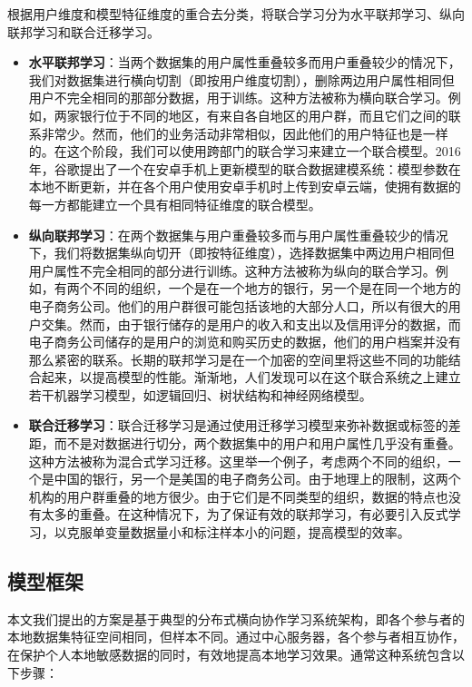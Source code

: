根据用户维度和模型特征维度的重合去分类，将联合学习分为水平联邦学习、纵向联邦学习和联合迁移学习。
\begin{itemize}
\item \textbf{水平联邦学习}：当两个数据集的用户属性重叠较多而用户重叠较少的情况下，我们对数据集进行横向切割（即按用户维度切割），删除两边用户属性相同但用户不完全相同的那部分数据，用于训练。这种方法被称为横向联合学习。例如，两家银行位于不同的地区，有来自各自地区的用户群，而且它们之间的联系非常少。然而，他们的业务活动非常相似，因此他们的用户特征也是一样的。在这个阶段，我们可以使用跨部门的联合学习来建立一个联合模型。2016年，谷歌提出了一个在安卓手机上更新模型的联合数据建模系统：模型参数在本地不断更新，并在各个用户使用安卓手机时上传到安卓云端，使拥有数据的每一方都能建立一个具有相同特征维度的联合模型。

\item \textbf{纵向联邦学习}：在两个数据集与用户重叠较多而与用户属性重叠较少的情况下，我们将数据集纵向切开（即按特征维度），选择数据集中两边用户相同但用户属性不完全相同的部分进行训练。这种方法被称为纵向的联合学习。例如，有两个不同的组织，一个是在一个地方的银行，另一个是在同一个地方的电子商务公司。他们的用户群很可能包括该地的大部分人口，所以有很大的用户交集。然而，由于银行储存的是用户的收入和支出以及信用评分的数据，而电子商务公司储存的是用户的浏览和购买历史的数据，他们的用户档案并没有那么紧密的联系。长期的联邦学习是在一个加密的空间里将这些不同的功能结合起来，以提高模型的性能。渐渐地，人们发现可以在这个联合系统之上建立若干机器学习模型，如逻辑回归、树状结构和神经网络模型。

\item \textbf{联合迁移学习}：联合迁移学习是通过使用迁移学习模型来弥补数据或标签的差距，而不是对数据进行切分，两个数据集中的用户和用户属性几乎没有重叠。这种方法被称为混合式学习迁移。这里举一个例子，考虑两个不同的组织，一个是中国的银行，另一个是美国的电子商务公司。由于地理上的限制，这两个机构的用户群重叠的地方很少。由于它们是不同类型的组织，数据的特点也没有太多的重叠。在这种情况下，为了保证有效的联邦学习，有必要引入反式学习，以克服单变量数据量小和标注样本小的问题，提高模型的效率。

\end{itemize}

\subsection{模型框架}
本文我们提出的方案是基于典型的分布式横向协作学习系统架构，即各个参与者的本地数据集特征空间相同，但样本不同。通过中心服务器，各个参与者相互协作，在保护个人本地敏感数据的同时，有效地提高本地学习效果。通常这种系统包含以下步骤：


